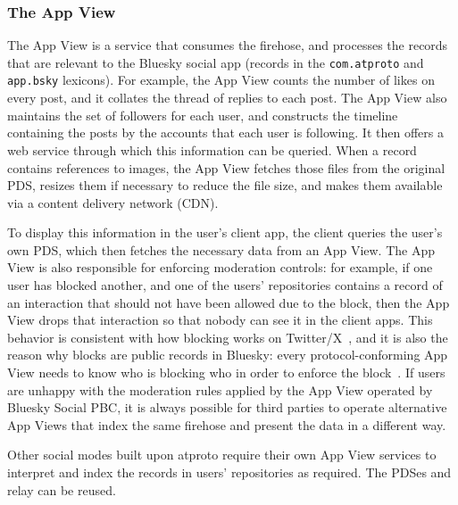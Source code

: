 \documentclass[sigconf]{acmart}
\begin{document}

\subsubsection{The App View}\label{sec:appview}

The App View is a service that consumes the firehose, and processes the records that are relevant to the Bluesky social app (records in the \texttt{com.atproto} and \texttt{app.bsky} lexicons).
For example, the App View counts the number of likes on every post, and it collates the thread of replies to each post.
The App View also maintains the set of followers for each user, and constructs the timeline containing the posts by the accounts that each user is following.
It then offers a web service through which this information can be queried.
When a record contains references to images, the App View fetches those files from the original PDS, resizes them if necessary to reduce the file size, and makes them available via a content delivery network (CDN).

To display this information in the user's client app, the client queries the user's own PDS, which then fetches the necessary data from an App View.
The App View is also responsible for enforcing moderation controls: for example, if one user has blocked another, and one of the users' repositories contains a record of an interaction that should not have been allowed due to the block, then the App View drops that interaction so that nobody can see it in the client apps.
This behavior is consistent with how blocking works on Twitter/X~\cite{TwitterBlock}, and it is also the reason why blocks are public records in Bluesky: every protocol-conforming App View needs to know who is blocking who in order to enforce the block~\cite{PublicBlocks,PrivateBlocks}.
If users are unhappy with the moderation rules applied by the App View operated by Bluesky Social PBC, it is always possible for third parties to operate alternative App Views that index the same firehose and present the data in a different way.

Other social modes built upon atproto require their own App View services to interpret and index the records in users' repositories as required.
The PDSes and relay can be reused.

\end{document}
